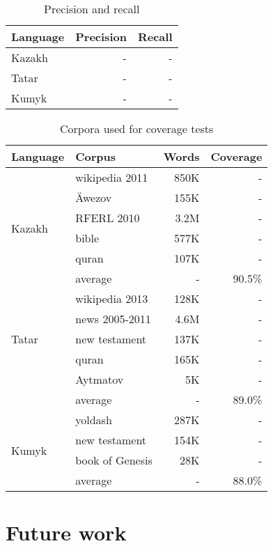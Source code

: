 \documentclass[a4paper,11pt,twocolumn]{article}
\begin{document}
\begin{table}
\begin{center}
\begin{tabular}{lrr}
\textbf{Language} & \textbf{Precision} & \textbf{Recall} \\
\hline
Kazakh & - &  - \\
Tatar & - & - \\
Kumyk & - & - \\
\hline
\end{tabular}
 \caption{Precision and recall}
 \label{table:coverage}
\end{center}
\end{table}

\begin{table}
\begin{center}
\begin{tabular}{llrr}
\toprule
\textbf{Language} & \textbf{Corpus} & \textbf{Words} & \textbf{Coverage} \\
\midrule
\multirow{6}{*}{Kazakh} & wikipedia 2011& 850K &  - \\
	& Äwezov & 155K & - \\
	& RFERL 2010 & 3.2M & - \\
	& bible & 577K & - \\
	& quran & 107K & - \\\cline{2-4}
	& average & - & 90.5\% \\
\midrule
\multirow{5}{*}{Tatar} & wikipedia 2013 & 128K &  - \\
	& news 2005-2011 & 4.6M & - \\
	& new testament & 137K & - \\
	& quran & 165K & - \\
	& Aytmatov & 5K & - \\\cline{2-4}
	& average & - & 89.0\% \\
\midrule
\multirow{4}{*}{Kumyk} & yoldash & 287K &  - \\
	& new testament & 154K & - \\
	& book of Genesis & 28K & - \\\cline{2-4}
	& average & - & 88.0\% \\
\bottomrule
\end{tabular}
 \caption{Corpora used for coverage tests}
 \label{table:corpora}
\end{center}
\end{table}



\section{Future work}
\end{document}
